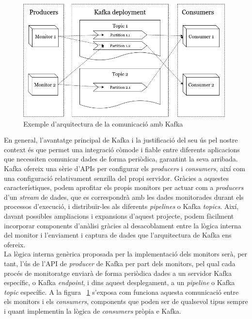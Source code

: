\begin{figure}
\centering
\includegraphics[width=11cm]{Figures/Figure7}
\decoRule
\caption[Exemple d'arquitectura de la comunicació amb Kafka]{Exemple d'arquitectura de la comunicació amb Kafka}
\label{fig:Kafka}
\end{figure}

En general, l'avantatge principal de Kafka i la justificació del seu ús pel nostre context és que permet una integració còmode i fiable entre diferents aplicacions que necessiten comunicar dades de forma periòdica, garantint la seva arribada. Kafka ofereix una sèrie d'APIs per configurar els \textit{producers} i \textit{consumers}, així com una configuració relativament senzilla del propi servidor. Gràcies a aquestes característiques, podem aprofitar els propis monitors per actuar com a \textit{producers} d'un \textit{stream} de dades, que es correspondrà amb les dades monitorades durant els processos d'execució, i distribuïr-les als diferents \textit{pipelines} o Kafka \textit{topics}. Així, davant possibles ampliacions i expansions d'aquest projecte, podem fàcilment incorporar components d'anàlisi gràcies al desacoblament entre la lògica interna del monitor i l'enviament i captura de dades que l'arquitectura de Kafka ens ofereix.\\

La lògica interna genèrica proposada per la implementació dels monitors serà, per tant, l'ús de l'API de \textit{producer} de Kafka per part dels monitors, pel qual cada procés de monitoratge enviarà de forma periòdica dades a un servidor Kafka específic, o Kafka \textit{endpoint}, i dins aquest desplegament, a un \textit{pipeline} o Kafka \textit{topic} específic. A la figura ~\ref{fig:Kafka} s'exposa com funciona aquesta comunicació entre els monitors i els \textit{consumers}, components que poden ser de qualsevol tipus sempre i quant implementin la lògica de \textit{consumers} pròpia e Kafka.\\

